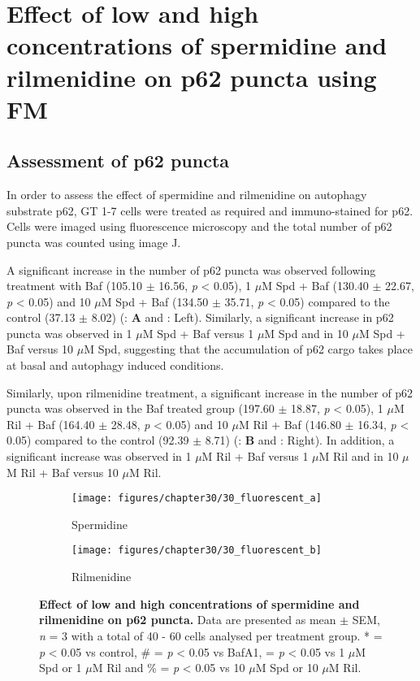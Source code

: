 \section{Effect of low and high concentrations of spermidine and rilmenidine on p62 puncta using FM}
\subsection{Assessment of p62 puncta}
In order to assess the effect of spermidine and rilmenidine on autophagy substrate p62, GT 1-7 cells were treated as required and immuno-stained for p62. Cells were imaged using fluorescence microscopy and the total number of p62 puncta was counted using image J. 

A significant increase in the number of p62 puncta was observed following treatment with Baf (105.10 $\pm$ 16.56, \textit{p} < 0.05), 1 $\mu$M Spd + Baf (130.40 $\pm$ 22.67, \textit{p} < 0.05) and 10 $\mu$M Spd + Baf (134.50 $\pm$ 35.71, \textit{p} < 0.05) compared to the control (37.13 $\pm$ 8.02) (: \textbf{A} and : Left). Similarly, a significant increase in p62 puncta was observed in 1 $\mu$M Spd + Baf versus 1 $\mu$M Spd and in 10 $\mu$M Spd + Baf versus 10 $\mu$M Spd, suggesting that the accumulation of p62 cargo takes place at basal and autophagy induced conditions. 

Similarly, upon rilmenidine treatment, a significant increase in the number of p62 puncta was observed in the Baf treated group (197.60 $\pm$ 18.87, \textit{p} < 0.05), 1 $\mu$M Ril + Baf (164.40 $\pm$ 28.48, \textit{p} < 0.05) and 10 $\mu$M Ril + Baf (146.80 $\pm$ 16.34, \textit{p} < 0.05) compared to the control (92.39 $\pm$ 8.71) (: \textbf{B} and : Right). In addition, a significant increase was observed in 1 $\mu$M Ril + Baf versus 1 $\mu$M Ril and in 10 $\mu$M Ril + Baf versus 10 $\mu$M Ril.

\begin{figure}[!htbp]
  \begin{subfigure}[b]{0.495\linewidth}
    \texttt{[image: figures/chapter30/30\_fluorescent\_a]}
    \caption{Spermidine}
  \end{subfigure}
  \begin{subfigure}[b]{0.495\linewidth}
    \texttt{[image: figures/chapter30/30\_fluorescent\_b]}
    \caption{Rilmenidine}
  \end{subfigure}
    \caption[Effect of low and high concentrations of spermidine and rilmenidine on p62 puncta]{\textbf{Effect of low and high concentrations of spermidine and rilmenidine on p62 puncta.} Data are presented as mean $\pm$ SEM, \textit{n} = 3 with a total of 40 - 60 cells analysed per treatment group. * = \textit{p} < 0.05 vs control, \# = \textit{p} < 0.05 vs BafA1, \@ = \textit{p} < 0.05 vs 1 $\mu$M Spd or 1 $\mu$M Ril and \% = \textit{p} < 0.05 vs 10 $\mu$M Spd or 10 $\mu$M Ril.}
  \label{fig:30_fluorescent_graph}
\end{figure}


